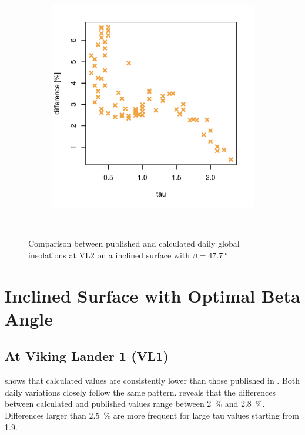 \begin{figure}[H]
\begin{subfigure}[t]{\subfigureWidth}
            \includegraphics[height=\graphicsHeight]{sections/appendix/insolation-calculation-verification/plots/h-diff-bet-exp-calc-at-vl2-with-beta-477-deg.png}
            \label{fig:sub:comparative-global-insolation-at-vl2-beta-equals-phi-percentage-differences}
    \end{subfigure}\\[0.8ex]
    \caption{Comparison between published and calculated daily global insolations at \ac{VL2} on a inclined surface with $\beta=\SI{47.7}{\degree}$.}
    \label{fig:plot:comparative-global-insolation-at-vl2-beta-equals-phi}
\vspace{-2ex}
\end{figure}

\section{Inclined Surface with Optimal Beta Angle}
\subsection{At Viking Lander 1 (VL1)}
 shows that calculated values are consistently lower than those published in . Both daily variations closely follow the same pattern.  reveals that the differences between calculated and published values range between \SI{2}{\percent} and \SI{2.8}{\percent}. Differences larger than \SI{2.5}{\percent} are more frequent for large tau values starting from 1.9.

